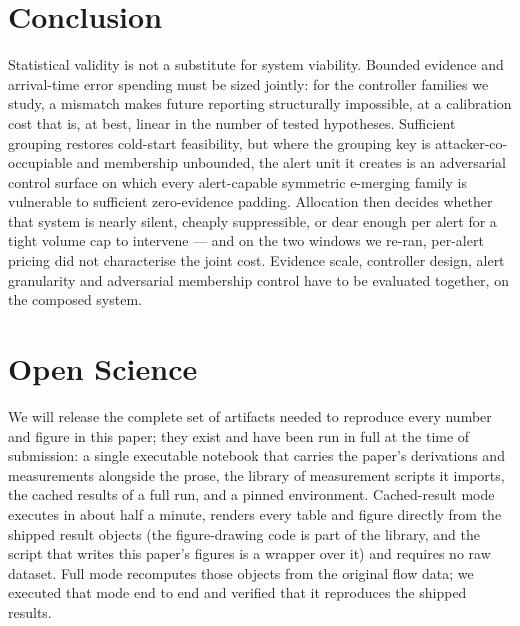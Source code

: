 \documentclass[conference]{IEEEtran}
\begin{document}
\section{Conclusion}\label{sec:conclusion}

Statistical validity is not a substitute for system viability. Bounded evidence and arrival-time error
spending must be sized jointly: for the controller families we study, a mismatch makes future reporting
structurally impossible, at a calibration cost that is, at best, linear in the number of tested
hypotheses. Sufficient grouping restores cold-start feasibility, but where the grouping key is
attacker-co-occupiable and membership unbounded, the alert unit it creates is an adversarial control
surface on which every alert-capable symmetric e-merging family is vulnerable to sufficient
zero-evidence padding. Allocation then decides whether that system is nearly silent, cheaply
suppressible, or dear enough per alert for a tight volume cap to intervene --- and on the two windows we
re-ran, per-alert pricing did not characterise the joint cost. Evidence scale, controller design, alert
granularity and adversarial membership control have to be evaluated together, on the composed system.


\section*{Open Science}\label{sec:openscience}

We will release the complete set of artifacts needed to reproduce every number and figure in this paper;
they exist and have been run in full at the time of submission: a single executable notebook that carries
the paper's derivations and measurements alongside the prose, the library of measurement scripts it
imports, the cached results of a full run, and a pinned environment. Cached-result mode executes in
about half a minute, renders every table and figure directly from the shipped result objects (the
figure-drawing code is part of the library, and the script that writes this paper's figures is a wrapper
over it) and requires no raw dataset. Full mode recomputes those objects from the original flow data; we
executed that mode end to end and verified that it reproduces the shipped results.
\end{document}
